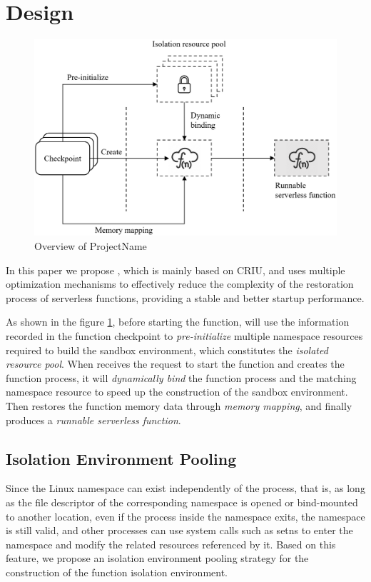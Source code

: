 \section{Design}

\begin{figure}[t]
    \centering
    \includegraphics[width=\linewidth]{images/design.PNG}
    \caption{Overview of ProjectName}
    \label{design}
\end{figure}

In this paper we propose \pname, 
which is mainly based on CRIU, 
and uses multiple optimization mechanisms to effectively reduce the complexity of the restoration process of serverless functions, 
providing a stable and better startup performance.


As shown in the figure \ref{design}, 
before starting the function, 
\pname will use the information recorded in the function checkpoint to \textit{pre-initialize} 
multiple namespace resources required to build the sandbox environment, 
which constitutes the \textit{isolated resource pool}.
When \pname receives the request to start the function and creates the function process, 
it will \textit{dynamically bind} the function process and the matching namespace resource to speed up the construction of the sandbox environment. 
Then \pname restores the function memory data through \textit{memory mapping}, 
and finally produces a \textit{runnable serverless function}.

\subsection{Isolation Environment Pooling}
Since the Linux namespace can exist independently of the process, 
that is, 
as long as the file descriptor of the corresponding namespace is opened or bind-mounted to another location, 
even if the process inside the namespace exits, 
the namespace is still valid, 
and other processes can use system calls such as setns to enter the namespace and modify the related resources referenced by it. 
Based on this feature, we propose an isolation environment pooling strategy for the construction of the function isolation environment.

